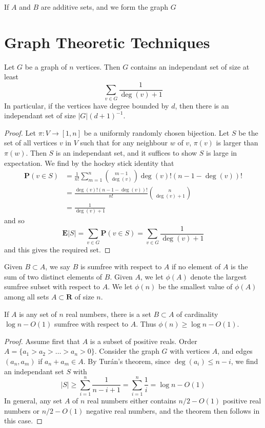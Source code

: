 If $A$ and $B$ are additive sets, and we form the graph $G$

\section{Graph Theoretic Techniques}

\begin{theorem}[Tur\'{a}n]
    Let $G$ be a graph of $n$ vertices. Then $G$ contains an independant set of size at least
    \[ \sum_{v \in G} \frac{1}{\deg(v) + 1} \]
    In particular, if the vertices have degree bounded by $d$, then there is an independant set of size $|G|(d+1)^{-1}$.
\end{theorem}
\begin{proof}
    Let $\pi: V \to [1,n]$ be a uniformly randomly chosen bijection. Let $S$ be the set of all vertices $v$ in $V$ such that for any neighbour $w$ of $v$, $\pi(v)$ is larger than $\pi(w)$. Then $S$ is an independant set, and it suffices to show $S$ is large in expectation. We find by the hockey stick identity that
    \begin{align*}
        \mathbf{P}(v \in S) &= \frac{1}{n!} \sum_{m = 1}^n {m-1 \choose \deg(v)} \deg(v)! (n - 1 - \deg(v))!\\
        &= \frac{\deg(v)! (n - 1- \deg(v))!}{n!} {n \choose \deg(v)+1}\\
        &= \frac{1}{\deg(v)+1}
    \end{align*}
    and so
    \[ \mathbf{E}|S| = \sum_{v \in G} \mathbf{P}(v \in S) = \sum_{v \in G} \frac{1}{\deg(v) + 1} \]
    and this gives the required set.
\end{proof}

Given $B \subset A$, we say $B$ is sumfree with respect to $A$ if no element of $A$ is the sum of two distinct elements of $B$. Given $A$, we let $\phi(A)$ denote the largest sumfree subset with respect to $A$. We let $\phi(n)$ be the smallest value of $\phi(A)$ among all sets $A \subset \mathbf{R}$ of size $n$.

\begin{theorem}[Choi]
    If $A$ is any set of $n$ real numbers, there is a set $B \subset A$ of cardinality $\log n - O(1)$ sumfree with respect to $A$. Thus $\phi(n) \geq \log n - O(1)$.
\end{theorem}
\begin{proof}
    Assume first that $A$ is a subset of positive reals. Order $A = \{ a_1 > a_2 > \dots > a_n > 0 \}$. Consider the graph $G$ with vertices $A$, and edges $(a_n, a_m)$ if $a_n + a_m \in A$. By Tur\'{a}n's theorem, since $\deg(a_i) \leq n - i$, we find an independant set $S$ with
    \[ |S| \geq \sum_{i = 1}^n \frac{1}{n - i + 1} = \sum_{i = 1}^n \frac{1}{i} = \log n - O(1) \]
    In general, any set $A$ of $n$ real numbers either contains $n/2 - O(1)$ positive real numbers or $n/2 - O(1)$ negative real numbers, and the theorem then follows in this case.
\end{proof}

